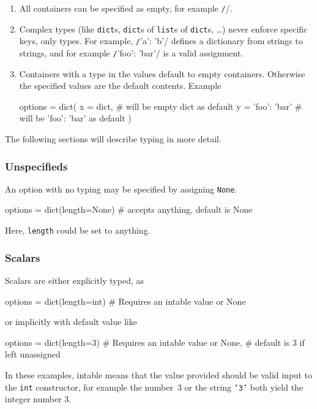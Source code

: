 \begin{enumerate}
\item All containers can be specified as empty, for example
  \texttt/{}/.  

\item Complex types (like \texttt{dict}s, \texttt{dict}s of
  \texttt{list}s of \texttt{dict}s, \dots) never enforce specific
  keys, only types.  For example, \texttt/{'a': 'b'}/
  defines a dictionary from strings to strings, and for example
  \texttt/{'foo': 'bar'}/ is a valid
  assignment.

\item Containers with a type in the values default to empty containers.
  Otherwise the specified values are the default contents.  Example
  \begin{python}
options = dict(
    x = dict,           # will be empty dict as default
    y = {'foo': 'bar'}  # will be {'foo': 'bar'} as default
)
  \end{python}
\end{enumerate}

The following sections will describe typing in more detail.

\subsubsection{Unspecifieds}
An option with no typing may be specified by assigning \texttt{None}.
\begin{python}
options = dict(length=None)  # accepts anything, default is None
\end{python}
Here, \texttt{length} could be set to anything.



\subsubsection*{Scalars}
Scalars are either explicitly typed, as
\begin{python}
options = dict(length=int)   # Requires an intable value or None
\end{python}
or implicitly with default value like
\begin{python}
options = dict(length=3)     # Requires an intable value or None,
                             # default is 3 if left unassigned
\end{python}
In these examples, intable means that the value provided should be
valid input to the \texttt{int} constructor, for example the number~3
or the string \texttt{'3'} both yield the integer number 3.



